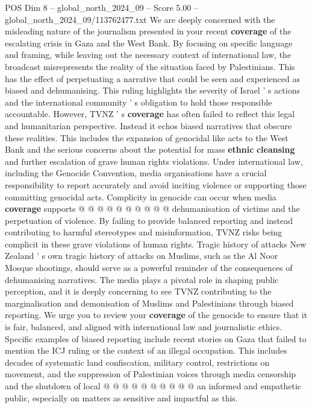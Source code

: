 \begin{textsample}{POS Dim 8 – global\_north\_2024\_09 – Score 5.00 – global\_north\_2024\_09/113762477.txt}  \label{ex:f8_pos_291}
We are deeply concerned with the misleading nature of the journalism presented in your recent \textbf{coverage} of the escalating crisis in Gaza and the West Bank.
By focusing on specific language and framing, while leaving out the necessary context of international law, the broadcast misrepresents the reality of the situation faced by Palestinians.
This has the effect of perpetuating a narrative that could be seen and experienced as biased and dehumanising.
This ruling highlights the severity of Israel ' s actions and the international community ' s obligation to hold those responsible accountable.
However, TVNZ ' s \textbf{coverage} has often failed to reflect this legal and humanitarian perspective.
Instead it echos biased narratives that obscure these realities.
This includes the expansion of genocidal like acts to the West Bank and the serious concerns about the potential for mass \textbf{ethnic} \textbf{cleansing} and further escalation of grave human rights violations.
Under international law, including the Genocide Convention, media organisations have a crucial responsibility to report accurately and avoid inciting violence or supporting those committing genocidal acts.
Complicity in genocide can occur when media \textbf{coverage} supports @ @ @ @ @ @ @ @ @ @ dehumanisation of victims and the perpetuation of violence.
By failing to provide balanced reporting and instead contributing to harmful stereotypes and misinformation, TVNZ risks being complicit in these grave violations of human rights.
Tragic history of attacks New Zealand ' s own tragic history of attacks on Muslims, such as the Al Noor Mosque shootings, should serve as a powerful reminder of the consequences of dehumanising narratives.
The media plays a pivotal role in shaping public perception, and it is deeply concerning to see TVNZ contributing to the marginalisation and demonisation of Muslims and Palestinians through biased reporting.
We urge you to review your \textbf{coverage} of the genocide to ensure that it is fair, balanced, and aligned with international law and journalistic ethics.
Specific examples of biased reporting include recent stories on Gaza that failed to mention the ICJ ruling or the context of an illegal occupation.
This includes decades of systematic land confiscation, military control, restrictions on movement, and the suppression of Palestinian voices through media censorship and the shutdown of local @ @ @ @ @ @ @ @ @ @ an informed and empathetic public, especially on matters as sensitive and impactful as this.

\end{textsample}
